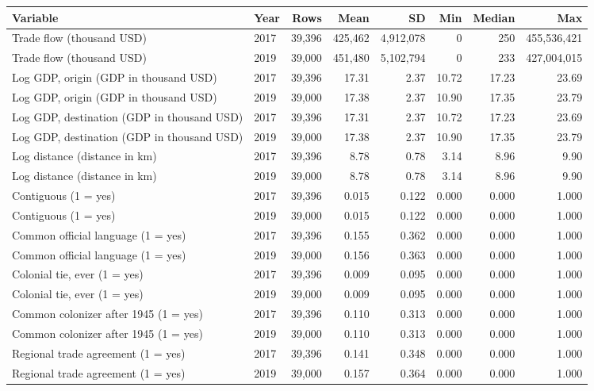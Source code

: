 \begin{tabular}{llrrrrrr}
\toprule
Variable & Year & Rows & Mean & SD & Min & Median & Max \\
\midrule
Trade flow (thousand USD) & 2017 & 39,396 & 425,462 & 4,912,078 & 0 & 250 & 455,536,421 \\
Trade flow (thousand USD) & 2019 & 39,000 & 451,480 & 5,102,794 & 0 & 233 & 427,004,015 \\
Log GDP, origin (GDP in thousand USD) & 2017 & 39,396 & 17.31 & 2.37 & 10.72 & 17.23 & 23.69 \\
Log GDP, origin (GDP in thousand USD) & 2019 & 39,000 & 17.38 & 2.37 & 10.90 & 17.35 & 23.79 \\
Log GDP, destination (GDP in thousand USD) & 2017 & 39,396 & 17.31 & 2.37 & 10.72 & 17.23 & 23.69 \\
Log GDP, destination (GDP in thousand USD) & 2019 & 39,000 & 17.38 & 2.37 & 10.90 & 17.35 & 23.79 \\
Log distance (distance in km) & 2017 & 39,396 & 8.78 & 0.78 & 3.14 & 8.96 & 9.90 \\
Log distance (distance in km) & 2019 & 39,000 & 8.78 & 0.78 & 3.14 & 8.96 & 9.90 \\
Contiguous (1 = yes) & 2017 & 39,396 & 0.015 & 0.122 & 0.000 & 0.000 & 1.000 \\
Contiguous (1 = yes) & 2019 & 39,000 & 0.015 & 0.122 & 0.000 & 0.000 & 1.000 \\
Common official language (1 = yes) & 2017 & 39,396 & 0.155 & 0.362 & 0.000 & 0.000 & 1.000 \\
Common official language (1 = yes) & 2019 & 39,000 & 0.156 & 0.363 & 0.000 & 0.000 & 1.000 \\
Colonial tie, ever (1 = yes) & 2017 & 39,396 & 0.009 & 0.095 & 0.000 & 0.000 & 1.000 \\
Colonial tie, ever (1 = yes) & 2019 & 39,000 & 0.009 & 0.095 & 0.000 & 0.000 & 1.000 \\
Common colonizer after 1945 (1 = yes) & 2017 & 39,396 & 0.110 & 0.313 & 0.000 & 0.000 & 1.000 \\
Common colonizer after 1945 (1 = yes) & 2019 & 39,000 & 0.110 & 0.313 & 0.000 & 0.000 & 1.000 \\
Regional trade agreement (1 = yes) & 2017 & 39,396 & 0.141 & 0.348 & 0.000 & 0.000 & 1.000 \\
Regional trade agreement (1 = yes) & 2019 & 39,000 & 0.157 & 0.364 & 0.000 & 0.000 & 1.000 \\
\bottomrule
\end{tabular}
